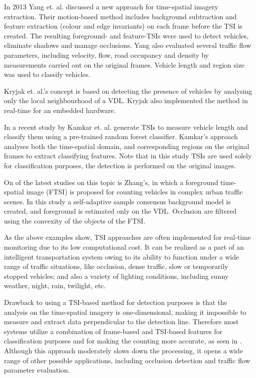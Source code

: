 In 2013 Yang et. al. discussed a new approach for time-spatial imagery extraction\cite{Yang2013a}.
Their motion-based method includes background subtraction and feature extraction (colour and edge invariants) on each frame before the TSI is created.
The resulting foreground- and feature-TSIs were used to detect vehicles, eliminate shadows and manage occlusions.
Yang also evaluated several traffic flow parameters, including velocity, flow, road occupancy and density by measurements carried out on the original frames. 
Vehicle length and region size was used to classify vehicles.

Kryjak et. al.'s concept is based on detecting the presence of vehicles by analysing only the local neighbourhood of a VDL.
Kryjak also implemented the method in real-time for an embedded hardware\cite{Kryjak2014}.

In a recent study by Kamkar et. al. generate TSIs to measure vehicle length and classify them using a pre-trained random forest classifier\cite{Kamkar2016}. 
Kamkar's approach analyses both the time-spatial domain, and corresponding regions on the original frames to extract classifying features.
Note that in this study TSIs are used solely for classification purposes, the detection is performed on the original images.

On of the latest studies on this topic is Zhang's, in which a foreground time-spatial image (FTSI) is proposed for counting vehicles in complex urban traffic scenes\cite{Zhang2016}.
In this study a self-adaptive sample consensus background model is created, and foreground is estimated only on the VDL.
Occlusion are filtered using the convexity of the objects of the FTSI.

As the above examples show, TSI approaches are often implemented for real-time monitoring due to its low computational cost.
It can be realized as a part of an intelligent transportation system owing to its ability to function under a wide range of traffic situations, like occlusion, dense traffic, slow or temporarily stopped vehicles; and also a variety of lighting conditions, including sunny weather, night, rain, twilight, etc.

Drawback to using a TSI-based method for detection purposes is that the analysis on the time-spatial imagery is one-dimensional, making it impossible to measure and extract data perpendicular to the detection line.
Therefore most systems utilize a combination of frame-based and TSI-based features for classification purposes and for making the counting more accurate, as seen in \cite{Kryjak2014, Yang2013a}. 
Although this approach moderately slows down the processing, it opens a wide range of other possible applications, including occlusion detection and traffic flow parameter evaluation.

